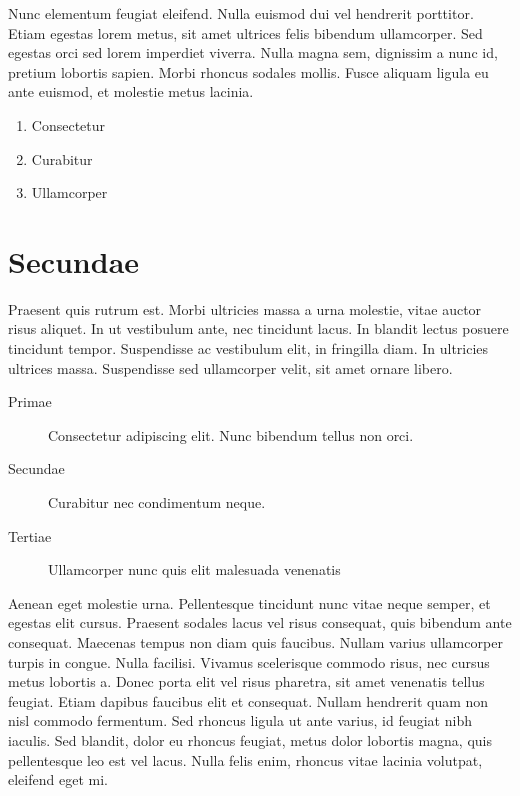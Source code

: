 \documentclass[a0paper]{test1}
\begin{document}
Nunc elementum feugiat eleifend. Nulla euismod dui vel hendrerit porttitor. Etiam egestas lorem metus, sit amet ultrices felis bibendum ullamcorper. Sed egestas orci sed lorem imperdiet viverra. Nulla magna sem, dignissim a nunc id, pretium lobortis sapien. Morbi rhoncus sodales mollis. Fusce aliquam ligula eu ante euismod, et molestie metus lacinia.

\begin{enumerate}
    \item Consectetur
    \item Curabitur
    \item Ullamcorper
\end{enumerate}

\section*{Secundae}
Praesent quis rutrum est. Morbi ultricies massa a urna molestie, vitae auctor risus aliquet. In ut vestibulum ante, nec tincidunt lacus. In blandit lectus posuere tincidunt tempor. Suspendisse ac vestibulum elit, in fringilla diam. In ultricies ultrices massa. Suspendisse sed ullamcorper velit, sit amet ornare libero.

\begin{description}
    \item[Primae] Consectetur adipiscing elit. Nunc bibendum tellus non orci.
    \item[Secundae] Curabitur nec condimentum neque.
    \item[Tertiae] Ullamcorper nunc quis elit malesuada venenatis
\end{description}

Aenean eget molestie urna. Pellentesque tincidunt nunc vitae neque semper, et egestas elit cursus. Praesent sodales lacus vel risus consequat, quis bibendum ante consequat. Maecenas tempus non diam quis faucibus. Nullam varius ullamcorper turpis in congue. Nulla facilisi. Vivamus scelerisque commodo risus, nec cursus metus lobortis a. Donec porta elit vel risus pharetra, sit amet venenatis tellus feugiat. Etiam dapibus faucibus elit et consequat. Nullam hendrerit quam non nisl commodo fermentum. Sed rhoncus ligula ut ante varius, id feugiat nibh iaculis. Sed blandit, dolor eu rhoncus feugiat, metus dolor lobortis magna, quis pellentesque leo est vel lacus. Nulla felis enim, rhoncus vitae lacinia volutpat, eleifend eget mi.
\end{document}
